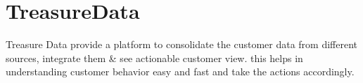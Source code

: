 \section{TreasureData}

Treasure Data provide a platform to consolidate the customer data from different sources, integrate them \& see actionable customer view. this helps in understanding customer behavior easy and fast and take the actions accordingly.\cites{hid-sp18-511-treasuredata}
